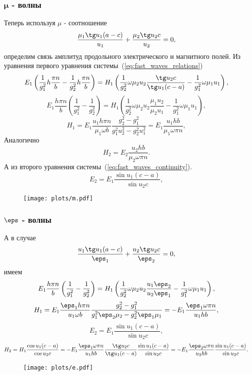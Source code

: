\documentclass[12pt]{hedsemwork}
\renewcommand{\frac}{\dfrac}
\begin{document}
\subsubsection{\(\boldsymbol{\mu}\) - волны}
Теперь используя \( \mu \) - соотношение
\[
    \frac{\mu_1\tg u_1 (a-c)}{u_1} + \frac{\mu_2\tg u_2 c}{u_2} = 0,
\]
определим связь амплитуд продольного электрического и магнитного полей.
Из уравнения первого уравнения системы~(\ref{eq:fast_waves_relations})
\[
    E_1\left(\frac{1}{g_1^2} h \frac{\pi n}{b}-
    \frac{1}{g_2^2}h \frac{\pi n}{b}\right) =
    H_1\left(\frac{1}{g_2^2}\omega\mu_2u_2\frac{\tg u_2 c}{\tg u_1 (c-a)}-
    \frac{1}{g_1^2}\omega\mu_1u_1\right),
\]
\[
    E_1\frac{h\pi n}{b}\left(\frac{1}{g_1^2}-\frac{1}{g_2^2}\right)=
    H_1\left(\frac{1}{g_2^2}\omega\mu_2u_2\frac{\mu_1u_2}{\mu_2u_1}-
    \frac{1}{g_1^2}\omega\mu_1u_1\right),
\]
\[
    H_1 = E_1\frac{u_1h\pi n}{\mu_1\omega b}
    \frac{g_2^2-g_1^2}{g_1^2u_2^2 - g_2^2u_1^2} =
    E_1\frac{u_1hb}{\mu_1\omega\pi n},
\]
Аналогично
\[
    H_2 = E_2\frac{u_2hb}{\mu_2\omega\pi n}.
\]
А из второго уравнения системы~(\ref{eq:fast_waves_continuity}).
\[
    E_2 = E_1\frac{\sin u_1(c-a)}{\sin u_2 c},
\]
\begin{figure}[h]
    \center
    \texttt{[image: plots/m.pdf]}
\end{figure}

\subsubsection{\(\boldsymbol{\eps}\) - волны}
А в случае
\[
    \frac{u_1\tg u_1 (a-c)}{\eps_1} + \frac{u_2\tg u_2 c}{\eps_2} = 0,
\]
имеем
\[
    E_1\frac{h\pi n}{b}\left(\frac{1}{g_1^2}-\frac{1}{g_2^2}\right)=
    H_1\left(\frac{1}{g_2^2}\omega\mu_2u_2\frac{u_1\eps_2}{u_2\eps_1}-
    \frac{1}{g_1^2}\omega\mu_1u_1\right),
\]
\[
    H_1 = E_1\frac{\eps_1h\pi n}{u_1\omega b}
    \frac{g_2^2-g_1^2}{g_1^2\eps_2\mu_2 - g_2^2\eps_1\mu_1} =
    -E_1\frac{\eps_1\omega\pi n}{u_1hb},
\]
\[
    E_2 = E_1\frac{\sin u_1(c-a)}{\sin u_2 c},
\]
\[
    H_2 = H_1 \frac{\cos u_1(c-a)}{\cos u_2 c} =
    -E_1\frac{\eps_1\omega\pi n}{u_1hb}\frac{\tg u_2c}{\tg u_1(c-a)}
    \frac{\sin u_1(c-a)}{\sin u_2 c} = -E_1\frac{\eps_2\omega\pi n}{u_2hb}
    \frac{\sin u_1(c-a)}{\sin u_2 c}.
\]
\begin{figure}[h]
    \center
    \texttt{[image: plots/e.pdf]}
\end{figure}
\end{document}
